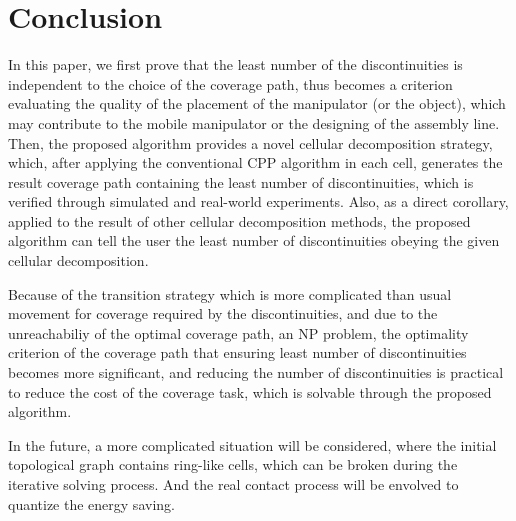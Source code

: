 \documentclass[journal]{IEEEtran}
\begin{document}
\section{Conclusion}\label{sectionconclusion}
In this paper, we first prove that the least number of the discontinuities is independent to the choice of the coverage path, thus becomes a criterion evaluating the quality of the placement of the manipulator (or the object), which may contribute to the mobile manipulator or the designing of the assembly line. Then, the proposed algorithm provides a novel cellular decomposition strategy, which, after applying the conventional CPP algorithm in each cell, generates the result coverage path containing the least number of discontinuities, which is verified through simulated and real-world experiments. 
Also, as a direct corollary, applied to the result of other cellular decomposition methods, the proposed algorithm can tell the user the least number of discontinuities obeying the given cellular decomposition. 

Because of the transition strategy which is more complicated than usual movement for coverage required by the discontinuities, and due to the unreachabiliy of the optimal coverage path, an NP problem, the optimality criterion of the coverage path that ensuring least number of discontinuities becomes more significant, and reducing the number of discontinuities is practical to reduce the cost of the coverage task, which is solvable through the proposed algorithm. 

In the future, a more complicated situation will be considered, where the initial topological graph contains ring-like cells, which can be broken during the iterative solving process. And the real contact process will be envolved to quantize the energy saving.



%
%
\end{document}
